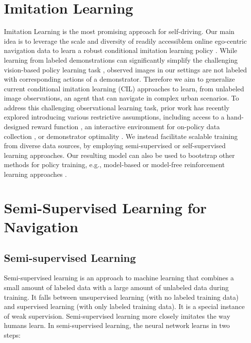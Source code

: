 \documentclass[12pt, letterpaper,cleardoubleempty,BCOR1cm]{scrbook}
\begin{document}
\section{Imitation Learning}
\label{sec:org4707ac7}
Imitation Learning is the most promising approach for self-driving. Our main
idea is to leverage the scale and diversity of readily accessiblem online
ego-centric navigation data to learn a robust conditional imitation learning
policy \cite{Chen2019,Codevilla2017}. While learning from labeled demonstrations
can significantly simplify the challenging vision-based policy learning task
\cite{article,Bojarski2016,7410669,chen2021learning,Gupta2017,Hawke2019,Li2018,Liang2018,Mueller2018,inproceedings,Osa2018,Pomerleau1988,Prakash2021,Zhang2021,DBLP:journals/corr/abs-1912-02973,Zhou2019a},
observed images in our settings are not labeled with corresponding actions of a
demonstrator. Therefore we aim to generalize current conditional imitation
learning (CIL) approaches \cite{Chen2019,Codevilla2017,Codevilla2019} to learn,
from unlabeled image observations, an agent that can navigate in complex urban
scenarios. To address this challenging observational learning task, prior work
has recently explored introducing various restrictive assumptions, including
access to a hand-designed reward function \cite{Chang2020}, an interactive
environment for on-policy data collection \cite{torabi2018}, or demonstrator
optimality \cite{torabi2018,Torabi2019}. We instead facilitate scalable training
from diverse data sources, by employing semi-supervised or self-supervised
learning approaches. Our resulting model can also be used to bootstrap other
methods for policy training, e.g., model-based or model-free reinforcement
learning approaches \cite{chen2021learning,Liang2018,9157137,Toromanoff2019}.

\section{Semi-Supervised Learning for Navigation \label{org1ae921c}}
\label{sec:org468eee3}

\subsection{Semi-supervised Learning}
\label{sec:org23681e8}
Semi-supervised learning is an approach to machine learning that combines a
small amount of labeled data with a large amount of unlabeled data during
training. It falls between unsupervised learning (with no labeled training data)
and supervised learning (with only labeled training data). It is a special
instance of weak supervision. Semi-supervised learning more closely imitates the
way humans learn. In semi-supervised learning, the neural network learns in two
steps:
\end{document}
